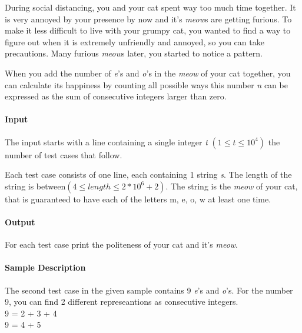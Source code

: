 




During social distancing, you and your cat spent way too much time together. It is very annoyed by your presence by now and it's \textit{meow}s are getting furious.
To make it less difficult to live with your grumpy cat, you wanted to find a way to figure out when it is extremely unfriendly and annoyed, so you can take precautions.
Many furious \textit{meow}s later, you started to notice a pattern.


When you add the number of \textit{e}'s and \textit{o}'s in the \textit{meow} of your cat together, you can calculate its happiness by counting all possible ways this number \textit{n} can be expressed as the sum of consecutive integers larger than zero.

\paragraph*{Input}

The input starts with a line containing a single integer \textit{t} 
\begin{math}(1\leq t\leq 10^4)\end{math}
 the number of test cases that follow.

Each test case consists of one line, each containing 1 string \textit{s}. The length of the string is between\begin{math}(4\leq length\leq 2*10^6+2)\end{math}.
The string is the \textit{meow} of your cat, that is guaranteed to have each of the letters m, e, o, w at least one time.
\paragraph*{Output}

For each test case print the politeness of your cat and it's \textit{meow}.
\begin{samples}
\end{samples}

\paragraph*{Sample Description}
The second test case in the given sample contains 9 \textit{e}'s and \textit{o}'s. For the number 9, you can find 2 different represeantions as consecutive integers.\\
9 = 2 + 3 + 4\\
9 = 4 + 5

